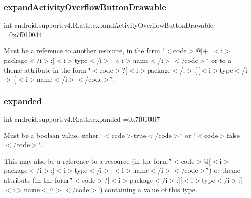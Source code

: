 \subsubsection{\texorpdfstring{expand\+Activity\+Overflow\+Button\+Drawable}{expandActivityOverflowButtonDrawable}}
{\footnotesize\ttfamily int android.\+support.\+v4.\+R.\+attr.\+expand\+Activity\+Overflow\+Button\+Drawable =0x7f010044\hspace{0.3cm}{\ttfamily [static]}}

Must be a reference to another resource, in the form \char`\"{}$<$code$>$@\mbox{[}+\mbox{]}\mbox{[}$<$i$>$package$<$/i$>$\+:\mbox{]}$<$i$>$type$<$/i$>$\+:$<$i$>$name$<$/i$>$$<$/code$>$\char`\"{} or to a theme attribute in the form \char`\"{}$<$code$>$?\mbox{[}$<$i$>$package$<$/i$>$\+:\mbox{]}\mbox{[}$<$i$>$type$<$/i$>$\+:\mbox{]}$<$i$>$name$<$/i$>$$<$/code$>$\char`\"{}. \mbox{\label{classandroid_1_1support_1_1v4_1_1R_1_1attr_a2c4f03dade210005e1bf41ee7b9383b1}} 
\subsubsection{\texorpdfstring{expanded}{expanded}}
{\footnotesize\ttfamily int android.\+support.\+v4.\+R.\+attr.\+expanded =0x7f0100f7\hspace{0.3cm}{\ttfamily [static]}}

Must be a boolean value, either \char`\"{}$<$code$>$true$<$/code$>$\char`\"{} or \char`\"{}$<$code$>$false$<$/code$>$\char`\"{}. 

This may also be a reference to a resource (in the form \char`\"{}$<$code$>$@\mbox{[}$<$i$>$package$<$/i$>$\+:\mbox{]}$<$i$>$type$<$/i$>$\+:$<$i$>$name$<$/i$>$$<$/code$>$\char`\"{}) or theme attribute (in the form \char`\"{}$<$code$>$?\mbox{[}$<$i$>$package$<$/i$>$\+:\mbox{]}\mbox{[}$<$i$>$type$<$/i$>$\+:\mbox{]}$<$i$>$name$<$/i$>$$<$/code$>$\char`\"{}) containing a value of this type. \mbox{\label{classandroid_1_1support_1_1v4_1_1R_1_1attr_ae9bc589f12bff8017da7402e0b008111}} 
